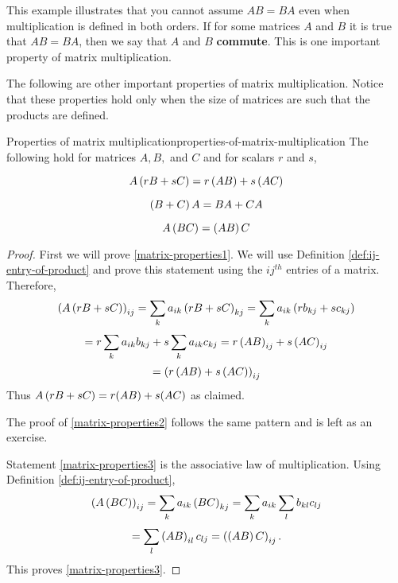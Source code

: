This example illustrates that you cannot assume $AB=BA$ even when
multiplication is defined in both orders. If for some matrices $A$ and
$B$ it is true that $AB=BA$, then we say that $A$ and $B$ \textbf{commute}. This is one 
important property of matrix multiplication.

The following are other important properties of matrix multiplication.
Notice that these properties hold only when the size of matrices are such that the products are defined. 

\begin{proposition}{Properties of matrix multiplication}{properties-of-matrix-multiplication}
The following hold for matrices $A,B,$ and $C$ and for scalars $r$ and $s$,

\begin{equation}
A\left(rB+sC\right) =r\left(AB\right) +s\left(AC\right)  \label{matrix-properties1}
\end{equation}

\begin{equation}
\left(B+C\right) A=BA+CA  \label{matrix-properties2}
\end{equation}

\begin{equation}
A\left(BC\right) =\left(AB\right) C  \label{matrix-properties3}
\end{equation}
\end{proposition}

\begin{proof}
 First we will prove \ref{matrix-properties1}. We will use Definition \ref{def:ij-entry-of-product} 
and prove this statement using the $ij^{th}$ entries of a matrix. 
Therefore, 
\begin{equation*}
\left(A\left(rB+sC\right) \right) _{ij}=\sum_{k}a_{ik}\left(rB+sC\right)
_{kj}=\sum_{k}a_{ik}\left(rb_{kj}+sc_{kj}\right)
\end{equation*}
\begin{equation*}
=r\sum_{k}a_{ik}b_{kj}+s\sum_{k}a_{ik}c_{kj}=r\left(AB\right) _{ij}+s\left(
AC\right) _{ij}
\end{equation*}
\begin{equation*}
=\left(r\left(AB\right) +s\left(AC\right) \right) _{ij}
\end{equation*}
Thus $A\left(rB+sC\right) =r(AB)+s(AC)$ as claimed. 

The proof of \ref{matrix-properties2} follows the same pattern and is left as an exercise. 

Statement \ref{matrix-properties3} is the associative law of multiplication. Using
Definition \ref{def:ij-entry-of-product},
\begin{equation*}
\left(A\left(BC\right) \right) _{ij}=\sum_{k}a_{ik}\left(BC\right)
_{kj}=\sum_{k}a_{ik}\sum_{l}b_{kl}c_{lj}
\end{equation*}
\begin{equation*}
=\sum_{l}\left(AB\right) _{il}c_{lj}=\left(\left(AB\right) C\right) _{ij}.
\end{equation*}
This proves \ref{matrix-properties3}.
\end{proof}
